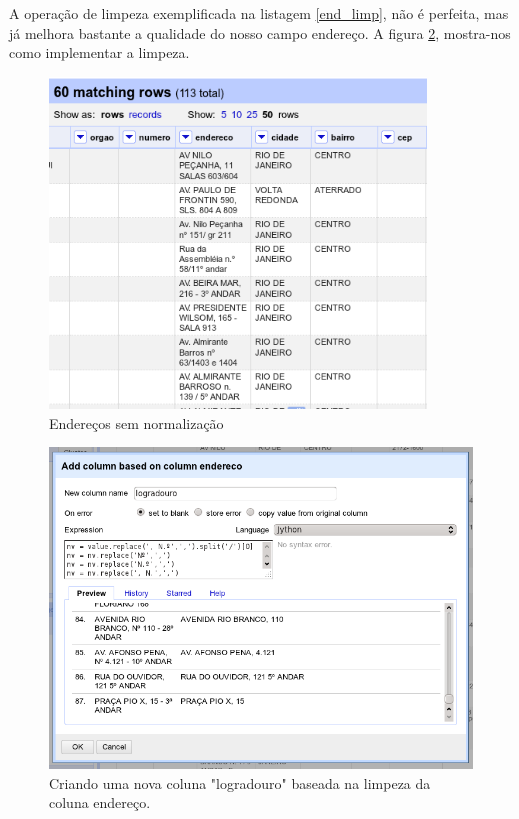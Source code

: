 \documentclass[a4paper,10pt]{report}
\begin{document}
A operação de limpeza exemplificada na listagem \ref{end_limp}, não é perfeita, mas já melhora bastante a qualidade do nosso campo endereço. A figura \ref{fig:limp_end}, mostra-nos como implementar a limpeza.


\begin{figure}[h!]
 \includegraphics[width=10cm]{./enderecos_sujos.png}
 \caption{Endereços sem normalização}
 \label{fig:endsujo}
\end{figure}

\begin{figure}[h!]
 \includegraphics[width=12cm]{./limpeza_end.png}
 \caption{Criando uma nova coluna "logradouro" baseada na limpeza da coluna endereço.}
 \label{fig:limp_end}
\end{figure}
\end{document}
